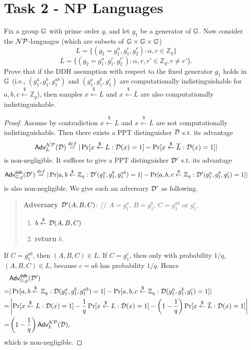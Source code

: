 \documentclass[12pt]{article}
\newcommand{\eqdef}{\stackrel{def}{=}}
\newcommand{\Z}{\mathbb{Z}}
\newcommand{\getsr}{\stackrel{\$}{\gets}}
\newcommand{\Adv}{\textsf{Adv}}
\theoremstyle{definition}
\begin{document}
\section{Task 2 - NP Languages}
Fix a group $\mathbb{G}$ with prime order $q$, and let $g_1$ be a generator of $\mathbb{G}$. Now consider the $\mathcal{NP}$-languages (which are subsets of $\mathbb{G} \times \mathbb{G} \times \mathbb{G}$)
$$L = \{(g_2= g_1^\alpha, g_1^r, g_2^r) : \alpha, r \in \Z_q\}$$
$$\overline{L} = \{(g_2 = g_1^\alpha, g_1^r, g_2^{r'}) : \alpha, r, r' \in \Z_q, r\not= r' \}.$$
Prove that if the DDH assumption with respect to the fixed generator $g_1$ holds in $\mathbb{G}$ (i.e., $(g_1^a, g_1^b, g_1^{ab})$ and $(g_1^a, g_1^b, g_1^c)$ are computationally indistinguishable for $a,b,c \getsr \Z_q$), then samples $x \getsr L$ and $x \getsr \overline{L}$ are also computationally indistinguishable.
\begin{proof}
Assume by contradiction $x \getsr L$ and $x \getsr \overline{L}$ are not computationally indistinguishable. Then there exists a PPT distinguisher $\mathcal{D}$ s.t. its advantage
$$\Adv_L^{\NP}(\D) \eqdef |\Pr[x \getsr L : \D(x) = 1] - \Pr[x \getsr \overline{L} : \D(x) = 1]|$$
is non-negligible. It suffices to give a PPT distinguisher $\mathcal{D}'$ s.t. its advantage
$$\Adv_{\G,g}^{\ddh}(\D') \eqdef |\Pr[a,b \getsr \Z_q : \D'(g_1^a, g_1^b, g_1^{ab}) = 1] - \Pr[a,b,c \getsr \Z_q : \D'(g_1^a, g_1^b, g_1^c) = 1]|$$
is also non-negligible.
We give such an adversary $\mathcal{D}'$ as following.
\begin{quote}
{\bf Adversary} $\mathcal{D}' (A, B, C)$: // $A = g_1^a$, $B = g_1^b$, $C = g_1^{ab}$ or $g_1^c$.
\begin{enumerate}
\item $b \getsr \D(A, B, C)$
\item {\bf return} $b$.
\end{enumerate}
\end{quote}
If $C = g_1^{ab}$, then $(A, B, C) \in L$. If $C = g_1^c$, then only with probability $1/q$, $(A, B, C) \in L$, because $c = ab$ has probability $1/q$. Hence
$$\begin{aligned}
& \Adv_{\G,g}^{\ddh}(\D')\\
=& |\Pr[a,b \getsr \Z_q : \D(g_1^a, g_1^b, g_1^{ab}) = 1] - \Pr[a,b,c \getsr \Z_q : \D(g_1^a, g_1^b, g_1^c) = 1]| \\
=& \left|\Pr[x \getsr L : \D(x) = 1] - \frac{1}{q}\Pr[x \getsr L : \D(x) = 1] - \left(1-\frac{1}{q}\right)\Pr[x \getsr \overline{L} : \D(x) = 1]\right| \\
=& \left(1-\frac{1}{q}\right) \Adv_L^{\NP}(\D),
\end{aligned}$$
which is non-negligible.
\end{proof}
\end{document}
